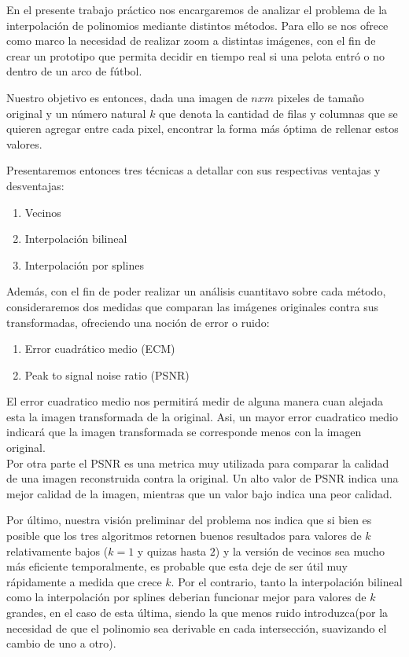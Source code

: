 En el presente trabajo práctico nos encargaremos de analizar el problema de la interpolación de polinomios mediante distintos métodos.
Para ello se nos ofrece como marco la necesidad de realizar zoom a distintas imágenes, con el fin de crear un prototipo que permita decidir en tiempo
real si una pelota entró o no dentro de un arco de fútbol.

Nuestro objetivo es entonces, dada una imagen de $n x m$ pixeles de tamaño original y un número natural $k$ que denota la cantidad de filas y
columnas que se quieren agregar entre cada pixel, encontrar la forma más óptima de rellenar estos valores.

Presentaremos entonces tres técnicas a detallar con sus respectivas ventajas y desventajas:
\begin{enumerate}
 \item Vecinos
 \item Interpolación bilineal
 \item Interpolación por splines
\end{enumerate}

Además, con el fin de poder realizar un análisis cuantitavo sobre cada método, consideraremos dos medidas que comparan las imágenes
originales contra sus transformadas, ofreciendo una noción de error o ruido:
\begin{enumerate}
 \item Error cuadrático medio (ECM)
 \item Peak to signal noise ratio (PSNR)
\end{enumerate}

El error cuadratico medio nos permitirá medir de alguna manera cuan alejada esta la imagen transformada de la original. Asi, un mayor error cuadratico medio indicará que la imagen transformada se corresponde menos con la imagen original.
\\
Por otra parte el PSNR es una metrica muy utilizada para comparar la calidad de una imagen reconstruida contra la original. Un alto valor de PSNR indica una mejor calidad de la imagen, mientras que un valor bajo indica una peor calidad.

Por último, nuestra visión preliminar del problema nos indica que si bien es posible que los tres algoritmos retornen buenos resultados
para valores de $k$ relativamente bajos ($k = 1$ y quizas hasta $2$) y la versión de vecinos sea mucho más eficiente temporalmente,
es probable que esta deje de ser útil muy rápidamente a medida que crece $k$. Por el contrario, tanto la interpolación bilineal como la
interpolación por splines deberian funcionar mejor para valores de $k$ grandes, en el caso de esta última, siendo la que menos ruido introduzca(por la necesidad de que el polinomio sea derivable en cada intersección, suavizando el cambio de uno a otro).
